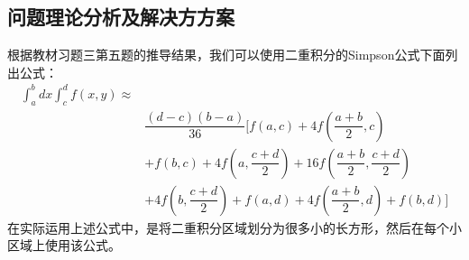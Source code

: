 \documentclass[10pt,a4paper]{ctexart}
\begin{document}
\subsection{问题理论分析及解决方方案}
根据教材习题三第五题的推导结果，我们可以使用二重积分的Simpson公式下面列出公式：
\begin{equation*}
\begin{split}
\int_{a}^{b}dx\int_{c}^{d}f(x,y)\approx \\ 
&\dfrac{(d-c)(b-a)}{36}[f(a,c)+4f(\dfrac{a+b}{2},c)\\
&+f(b,c)+4f(a,\dfrac{c+d}{2})+16f(\dfrac{a+b}{2},\dfrac{c+d}{2})\\
&+4f(b,\dfrac{c+d}{2})+f(a,d)+4f(\dfrac{a+b}{2},d)+f(b,d)]
\end{split}
\end{equation*}
在实际运用上述公式中，是将二重积分区域划分为很多小的长方形，然后在每个小区域上使用该公式。
\end{document}
